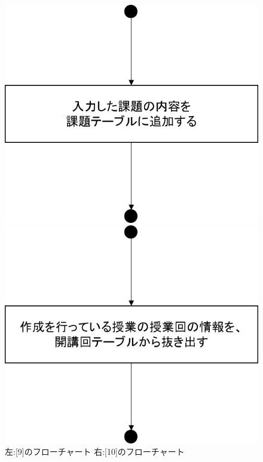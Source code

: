 \begin{figure}[htbp]
 \begin{minipage}{0.5\hsize}
  \begin{center}
   \includegraphics[width=0.5\linewidth,clip]{./img/create_lecture/sub9.png}
  \end{center}
 \end{minipage}
 \begin{minipage}{0.5\hsize}
  \begin{center}
   \includegraphics[width=0.5\linewidth,clip]{./img/create_lecture/sub10.png}
  \end{center}
 \end{minipage}
 \caption{左:[9]のフローチャート 右:[10]のフローチャート}\label{fig:createlectureflow4}
\end{figure}

